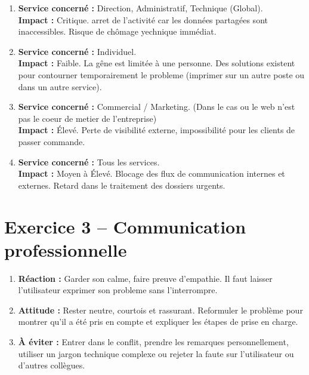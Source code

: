 \documentclass[12pt,a4paper]{extarticle}
\begin{document}
\begin{enumerate}
    \item \textbf{Service concerné :} Direction, Administratif, Technique (Global).\\
          \textbf{Impact :} Critique. arret de l'activité car les données partagées sont inaccessibles. Risque de chômage yechnique immédiat.
    \item \textbf{Service concerné :} Individuel.\\
          \textbf{Impact :} Faible. La gêne est limitée à une personne. Des solutions existent pour contourner temporairement le probleme (imprimer sur un autre poste ou dans un autre service).
    \item \textbf{Service concerné :} Commercial / Marketing. (Dans le cas ou le web n'est pas le coeur de metier de l'entreprise)\\
          \textbf{Impact :} Élevé. Perte de visibilité externe, impossibilité pour les clients de passer commande.
    \item \textbf{Service concerné :} Tous les services.\\
          \textbf{Impact :} Moyen à Élevé. Blocage des flux de communication internes et externes. Retard dans le traitement des dossiers urgents.
\end{enumerate}

\vspace{0.5cm}


\section*{Exercice 3 -- Communication professionnelle}

\begin{enumerate}
    \item \textbf{Réaction :} Garder son calme, faire preuve d'empathie. Il faut laisser l'utilisateur exprimer son probleme sans l'interrompre.
    \item \textbf{Attitude :} Rester neutre, courtois et rassurant. Reformuler le problème pour montrer qu'il a été pris en compte et expliquer les étapes de prise en charge.
    \item \textbf{À éviter :} Entrer dans le conflit, prendre les remarques personnellement, utiliser un jargon technique complexe ou rejeter la faute sur l'utilisateur ou d'autres collègues.
\end{enumerate}

\vspace{0.5cm}
\end{document}
